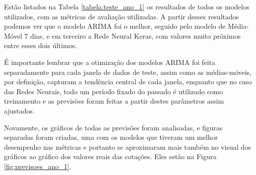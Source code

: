 Estão listados na Tabela \ref{tabela:teste_ano_1} os resultados de todos os modelos utilizados, com as métricas de avaliação utilizadas. A partir desses resultados podemos ver que o modelo ARIMA foi o melhor, seguido pelo modelo de Média-Móvel $7$ dias, e em terceiro a Rede Neural Keras, com valores muito próximos entre esses dois últimos.

\begin{table}[]
\begin{center}
\caption{Métricas das previsões para um ano dos modelos das janelas de cotações do Dólar.}\label{tabela:teste_ano_1}
\end{center}
\end{table}

É importante lembrar que a otimização dos modelos ARIMA foi feita separadamente para cada janela de dados de teste, assim como as médias-móveis, por definição, capturam a tendência central de cada janela, enquanto que no caso das Redes Neurais, todo um período fixado do passado é utilizado como treinamento e as previsões foram feitas a partir destes parâmetros assim ajustados.


Novamente, os gráficos de todas as previsões foram analisadas, e figuras separadas foram criadas, uma com os modelos que tiveram um melhor desempenho nas métricas e portanto se aproximaram mais também no visual dos gráficos ao gráfico dos valores reais das cotações. Eles estão na Figura \ref{fig:previsoes_ano_1}.

